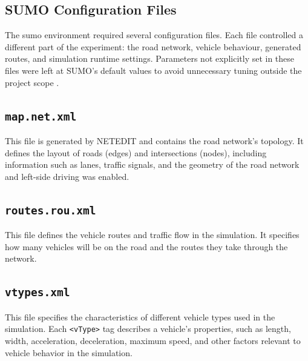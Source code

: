 \subsection{SUMO Configuration Files}
\label{subsec:sumo_config}
The \gls{sumo} environment required several configuration files. Each file controlled a different part of the experiment: the road network, vehicle behaviour, generated routes, and simulation runtime settings. Parameters not explicitly set in these files were left at SUMO's default values to avoid unnecessary tuning outside the project scope \cite{SUMO2025}.

\subsection{\texttt{map.net.xml}}
\label{subsec:map_net_xml}
This file is generated by NETEDIT and contains the road network's topology. It defines the layout of roads (edges) and intersections (nodes), including information such as lanes, traffic signals, and the geometry of the road network and left-side driving was enabled.

\subsection{\texttt{routes.rou.xml}}
\label{subsec:routes_rou_xml}
This file defines the vehicle routes and traffic flow in the simulation. It specifies how many vehicles will be on the road and the routes they take through the network.

\subsection{\texttt{vtypes.xml}}
\label{subsec:vtypes_xml}
This file specifies the characteristics of different vehicle types used in the simulation. Each \texttt{<vType>} tag describes a vehicle's properties, such as length, width, acceleration, deceleration, maximum speed, and other factors relevant to vehicle behavior in the simulation.

